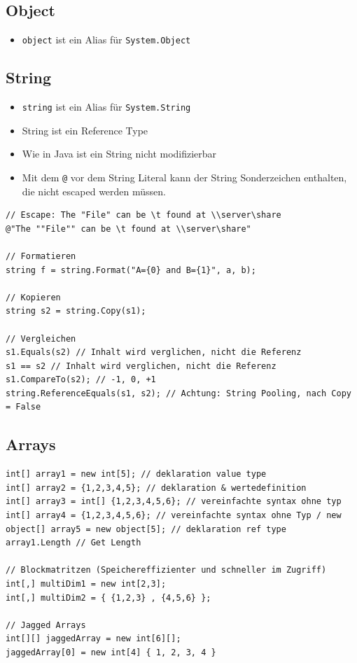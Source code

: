\subsection{Object}
\begin{itemize}
	\item \lstinline|object| ist ein Alias für \lstinline|System.Object|
\end{itemize}

\subsection{String}
\begin{itemize}
	\item \lstinline|string| ist ein Alias für \lstinline|System.String|
	\item String ist ein Reference Type
	\item Wie in Java ist ein String nicht modifizierbar
	\item Mit dem \lstinline|@| vor dem String Literal kann der String Sonderzeichen enthalten, die nicht escaped werden müssen.
\end{itemize}
\begin{lstlisting}
// Escape: The "File" can be \t found at \\server\share
@"The ""File"" can be \t found at \\server\share"

// Formatieren
string f = string.Format("A={0} and B={1}", a, b);

// Kopieren
string s2 = string.Copy(s1);

// Vergleichen
s1.Equals(s2) // Inhalt wird verglichen, nicht die Referenz
s1 == s2 // Inhalt wird verglichen, nicht die Referenz
s1.CompareTo(s2); // -1, 0, +1 
string.ReferenceEquals(s1, s2); // Achtung: String Pooling, nach Copy = False
\end{lstlisting}

\clearpage

\subsection{Arrays}
\begin{lstlisting}
int[] array1 = new int[5]; // deklaration value type
int[] array2 = {1,2,3,4,5}; // deklaration & wertedefinition
int[] array3 = int[] {1,2,3,4,5,6}; // vereinfachte syntax ohne typ
int[] array4 = {1,2,3,4,5,6}; // vereinfachte syntax ohne Typ / new
object[] array5 = new object[5]; // deklaration ref type
array1.Length // Get Length

// Blockmatritzen (Speichereffizienter und schneller im Zugriff)
int[,] multiDim1 = new int[2,3];
int[,] multiDim2 = { {1,2,3} , {4,5,6} };

// Jagged Arrays
int[][] jaggedArray = new int[6][];
jaggedArray[0] = new int[4] { 1, 2, 3, 4 }
\end{lstlisting}

